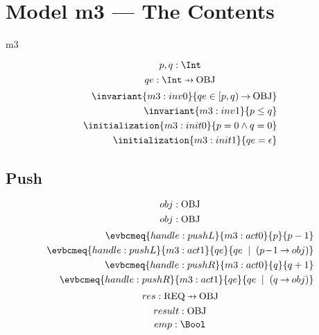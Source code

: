\documentclass[12pt]{amsart}
\newcommand{\REQ}{\text{REQ}}
\begin{document}
\section{Model m3 --- The Contents}
\begin{machine}{m3}

  \newset{\OBJ}
  \[ \variable{ p,q : \Int } \]
  \[ \variable{ qe : \Int \pfun \OBJ } \]
  \begin{align}
    \invariant{m3:inv0}{ qe \in \intervalR{p}{q} \tfun \OBJ } \\
    \invariant{m3:inv1}{ p \le q } \\
    \initialization{m3:init0}{ p = 0 \land q = 0} \\
    \initialization{m3:init1}{ qe = \emptyfun }
  \end{align}
  \subsection{Push}
    \[\param{handle:pushL}{obj : \OBJ} \]
    \[\param{handle:pushR}{obj : \OBJ} \]
  \begin{align}
    \evbcmeq{handle:pushL}{m3:act0}{p}{p - 1} \\
    \evbcmeq{handle:pushL}{m3:act1}{qe}{ qe \2| (p \0- 1 \fun obj)} \\
    \evbcmeq{handle:pushR}{m3:act0}{q}{q + 1} \\
    \evbcmeq{handle:pushR}{m3:act1}{qe}{ qe \2| (q \fun obj)} 
  \end{align}
  \[ \variable{ res : \REQ \pfun \OBJ } \]
  \[ \variable{ result : \OBJ } \]
  \[ \variable{ emp : \Bool } \]

\end{machine}
\end{document}
